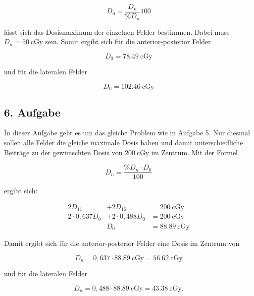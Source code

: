 \begin{equation*}
  D_0 = \frac{D_n}{\%D_n} 100
\end{equation*}

lässt sich das Dosismaximum der einzelnen Felder bestimmen. Dabei muss
$D_n = \SI{50}{\centi\gray}$ sein.
Somit ergibt sich für die anterior-posterior Felder

\begin{equation*}
  D_0 = \SI{78.49}{\centi\gray}
\end{equation*}

und für die lateralen Felder

\begin{equation*}
  D_0 = \SI{102.46}{\centi\gray}
\end{equation*}

\subsection*{6. Aufgabe}

In dieser Aufgabe geht es um das gleiche Problem wie in Aufgabe 5. Nur diesmal
sollen alle Felder die gleiche maximale Dosis haben und damit
unterschiedliche Beiträge zu der gewünschten Dosis von $\SI{200}{\centi\gray}$
im Zentrum. Mit der Formel

\begin{equation*}
  D_n = \frac{\%D_n \cdot D_0}{100}
\end{equation*}

ergibt sich:

\begin{align*}
  2 D_{11} &+ 2 D_{16} &= \SI{200}{\centi\gray} \\
  2 \cdot 0,637 D_0 &+ 2 \cdot 0,488 D_0 &= \SI{200}{\centi\gray} \\
   & D_0 &= \SI{88.89}{\centi\gray}
\end{align*}

Damit ergibt sich für die anterior-posterior Felder eine Dosis im Zentrum von

\begin{equation*}
  D_n = 0,637 \cdot \SI{88.89}{\centi\gray} = \SI{56.62}{\centi\gray}
\end{equation*}

und für die lateralen Felder

\begin{equation*}
  D_n = 0,488 \cdot \SI{88.89}{\centi\gray} = \SI{43.38}{\centi\gray}.
\end{equation*}

